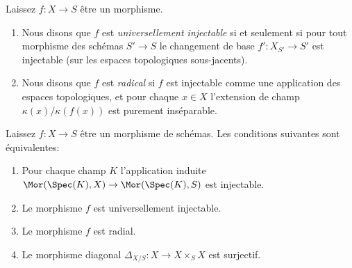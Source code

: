 \begin{definition}

\label{definition-universally-injective}
Laissez $f : X \to S$ être un morphisme.
\begin{enumerate}
\item Nous disons que $f$ est {\it universellement injectable} si et seulement si pour tout morphisme des schémas $S' \to S$ le changement de base $f' : X_{S'} \to S'$ est injectable (sur les espaces topologiques sous-jacents).
\item Nous disons que $f$ est {\it radical} si $f$ est injectable comme une application des espaces topologiques, et pour chaque $x \in X$ l'extension de champ $\kappa(x)/\kappa(f(x))$ est purement inséparable.
\end{enumerate}

\end{definition}

\begin{lemma}

\label{lemma-universally-injective}

\begin{reference}
\cite[proposition 3.7.1]{EGA1-seconde}
\end{reference}
Laissez $f : X \to S$ être un morphisme de schémas. Les conditions suivantes sont équivalentes:
\begin{enumerate}
\item Pour chaque champ $K$ l'application induite $\Mor(\Spec(K), X) \to \Mor(\Spec(K), S)$ est injectable.
\item Le morphisme $f$ est universellement injectable.
\item Le morphisme $f$ est radial.
\item Le morphisme diagonal $\Delta_{X/S} : X \longrightarrow X \times_S X$ est surjectif.
\end{enumerate}

\end{lemma}

